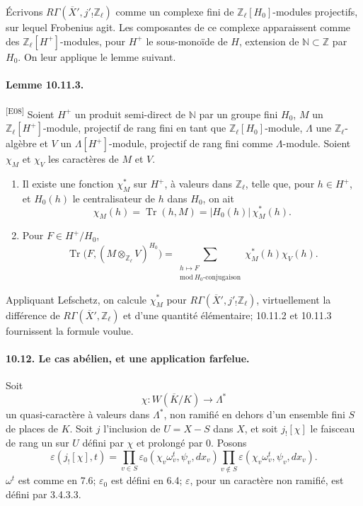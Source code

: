 \documentclass[10pt,letterpaper]{article}
\newcommand{\Z}{\mathbb Z}
\newcommand{\Tr}{\operatorname{Tr}}
\providecommand{\Tr}{\operatorname{Tr}}
\providecommand{\Tr}{\operatorname{Tr}}
\providecommand{\Tr}{\operatorname{Tr}}
\newcommand{\auditmark}[1]{\textsuperscript{\normalfont\scriptsize[E#1]}}
\begin{document}
Écrivons \(R\Gamma(\overline X',j'_!\Z_\ell)\) comme un complexe fini de \(\Z_\ell[H_0]\)-modules projectifs, sur lequel Frobenius agit. Les composantes de ce complexe apparaissent comme des \(\Z_\ell[H^+]\)-modules, pour \(H^+\) le sous-monoïde de \(H\), extension de \(\mathbb N\subset\Z\) par \(H_0\). On leur applique le lemme suivant.

\paragraph{Lemme 10.11.3.}\auditmark{08} Soient \(H^+\) un produit semi-direct de \(\mathbb N\) par un groupe fini \(H_0\), \(M\) un \(\Z_\ell[H^+]\)-module, projectif de rang fini en tant que \(\Z_\ell[H_0]\)-module, \(\Lambda\) une \(\Z_\ell\)-algèbre et \(V\) un \(\Lambda[H^+]\)-module, projectif de rang fini comme \(\Lambda\)-module. Soient \(\chi_M\) et \(\chi_V\) les caractères de \(M\) et \(V\).
\begin{enumerate}[label=(\roman*)]
\item Il existe une fonction \(\chi_M^*\) sur \(H^+\), à valeurs dans \(\Z_\ell\), telle que, pour \(h\in H^+\), et \(H_0(h)\) le centralisateur de \(h\) dans \(H_0\), on ait
\[
\chi_M(h)=\Tr(h,M)=|H_0(h)|\,\chi_M^*(h).
\]
\item Pour \(F\in H^+/H_0\),
\[
\Tr\bigl(F,(M\otimes_{\Z_\ell}V)^{H_0}\bigr)
=
\sum_{\substack{h\mapsto F\\ \mathrm{mod}\ H_0\text{-conjugaison}}}
\chi_M^*(h)\chi_V(h).
\]
\end{enumerate}

Appliquant Lefschetz, on calcule \(\chi_M^*\) pour \(R\Gamma(\overline X',j'_!\Z_\ell)\), virtuellement la différence de \(R\Gamma(\overline X',\Z_\ell)\) et d'une quantité élémentaire; 10.11.2 et 10.11.3 fournissent la formule voulue.





\paragraph{10.12. Le cas abélien, et une application farfelue.} Soit
\[
\chi:W(\overline K/K)\longrightarrow \Lambda^*
\]
un quasi-caractère à valeurs dans \(\Lambda^*\), non ramifié en dehors d'un ensemble fini \(S\) de places de \(K\). Soit \(j\) l'inclusion de \(U=X-S\) dans \(X\), et soit \(j_![\chi]\) le faisceau de rang un sur \(U\) défini par \(\chi\) et prolongé par \(0\). Posons
\[
\varepsilon(j_![\chi],t)=
\prod_{v\in S}\varepsilon_0(\chi_v\omega_v^t,\psi_v,dx_v)
\prod_{v\notin S}\varepsilon(\chi_v\omega_v^t,\psi_v,dx_v).
\]
\(\omega^t\) est comme en 7.6; \(\varepsilon_0\) est défini en 6.4; \(\varepsilon\), pour un caractère non ramifié, est défini par 3.4.3.3.
\end{document}
